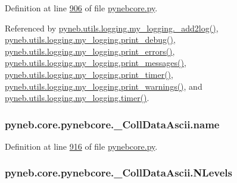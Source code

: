 Definition at line \hyperlink{pynebcore_8py_source_l00906}{906} of file \hyperlink{pynebcore_8py_source}{pynebcore.\+py}.



Referenced by \hyperlink{logging_8py_source_l00059}{pyneb.\+utils.\+logging.\+my\+\_\+logging.\+\_\+add2log()}, \hyperlink{logging_8py_source_l00157}{pyneb.\+utils.\+logging.\+my\+\_\+logging.\+print\+\_\+debug()}, \hyperlink{logging_8py_source_l00149}{pyneb.\+utils.\+logging.\+my\+\_\+logging.\+print\+\_\+errors()}, \hyperlink{logging_8py_source_l00133}{pyneb.\+utils.\+logging.\+my\+\_\+logging.\+print\+\_\+messages()}, \hyperlink{logging_8py_source_l00165}{pyneb.\+utils.\+logging.\+my\+\_\+logging.\+print\+\_\+timer()}, \hyperlink{logging_8py_source_l00141}{pyneb.\+utils.\+logging.\+my\+\_\+logging.\+print\+\_\+warnings()}, and \hyperlink{logging_8py_source_l00115}{pyneb.\+utils.\+logging.\+my\+\_\+logging.\+timer()}.

\hypertarget{classpyneb_1_1core_1_1pynebcore_1_1___coll_data_ascii_a39c9697691d3e8e8d7f99c05e0baa4a9}{}
\subsubsection[{name}]{\setlength{\rightskip}{0pt plus 5cm}pyneb.\+core.\+pynebcore.\+\_\+\+Coll\+Data\+Ascii.\+name}\label{classpyneb_1_1core_1_1pynebcore_1_1___coll_data_ascii_a39c9697691d3e8e8d7f99c05e0baa4a9}


Definition at line \hyperlink{pynebcore_8py_source_l00916}{916} of file \hyperlink{pynebcore_8py_source}{pynebcore.\+py}.

\hypertarget{classpyneb_1_1core_1_1pynebcore_1_1___coll_data_ascii_a718c85715ee6ef5dfdd4136e2031030b}{}
\subsubsection[{N\+Levels}]{\setlength{\rightskip}{0pt plus 5cm}pyneb.\+core.\+pynebcore.\+\_\+\+Coll\+Data\+Ascii.\+N\+Levels}\label{classpyneb_1_1core_1_1pynebcore_1_1___coll_data_ascii_a718c85715ee6ef5dfdd4136e2031030b}


